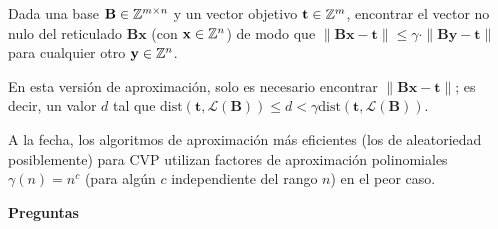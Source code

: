 \begin{frame}
\begin{definition}
Dada una base $\mathbf{B}\in \mathbb{Z}^{m\times n}$ y un vector objetivo $\mathbf{t} \in \mathbb{Z}^m$, encontrar el vector no nulo del reticulado $\mathbf{Bx}$ (con $\mathbf{x}\in \mathbb{Z}^n$) de modo que $\|\mathbf{Bx}-\mathbf{t}\| \leq \gamma \cdot \|\mathbf{By}-\mathbf{t}\|$ para cualquier otro $\mathbf{y} \in \mathbb{Z}^n$.
\end{definition}

En esta versión de aproximación, solo es necesario encontrar $\|\mathbf{Bx}-\mathbf{t}\|$; es decir, un valor $d$ tal que $\text{dist}(\mathbf{t},\mathcal{L}(\mathbf{B})) \leq d < \gamma \text{dist}(\mathbf{t},\mathcal{L}(\mathbf{B}))$.

A la fecha, los algoritmos de aproximación más eficientes (los de aleatoriedad posiblemente) para CVP utilizan factores de aproximación polinomiales $\gamma(n) = n^c$ (para algún $c$ independiente del rango $n$) en el peor caso.
    
\end{frame}

\begin{frame}
    \begin{center}
        {\huge \bf Preguntas}
    \end{center}
\end{frame}

